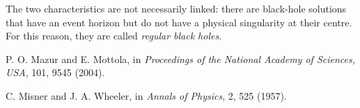 \begin{description}[style=multiline,leftmargin=2em,labelwidth=1.5em]
\item[8.]\hypertarget{note:06-08}{}The two characteristics are not necessarily linked: there are black-hole solutions that
have an event horizon but do not have a physical singularity at their
centre. For this reason, they are called \emph{regular black holes}.

\item[9.]\hypertarget{note:06-09}{}P. O. Mazur and E. Mottola, in \emph{Proceedings of the National Academy of Sciences,
USA}, 101, 9545 (2004).

\item[10.]\hypertarget{note:06-10}{}C. Misner and J. A. Wheeler, in \emph{Annals of Physics}, 2, 525 (1957).

\end{description}
